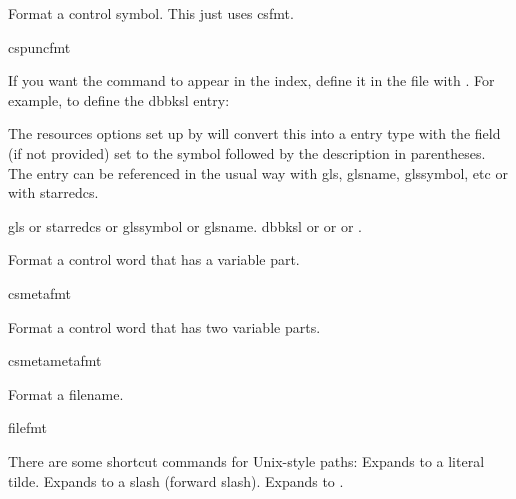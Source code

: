 \documentclass[toc=listof]{scrreport}
\begin{document}
Format a control symbol. This just uses \gls{csfmt}.
\begin{coderesult}
\gls{cspuncfmt}
\tcblower
\cspuncfmt{\textasciitilde}
\end{coderesult}

If you want the command to appear in the index, define it in the
 file with . For example, to define
the \gls{dbbksl} entry:
\begin{codebox}
\end{codebox}
The resources options set up by  will convert this
into a  entry type with the  field
(if not provided) set to the symbol followed by the description in
parentheses. The entry can be referenced in the usual way with
\gls{gls}, \gls{glsname}, \gls{glssymbol}, etc or with \gls{starredcs}.
\begin{coderesult}
\gls{gls} or
\gls{starredcs} or
\gls{glssymbol} or
\gls{glsname}.
\tcblower
\gls{dbbksl} or
 or
 or
.
\end{coderesult}

Format a control word that has a variable part.
\begin{coderesult}
\gls{csmetafmt}
\tcblower
{}
\end{coderesult}

Format a control word that has two variable parts.
\begin{coderesult}
\gls{csmetametafmt}
\tcblower
{}
\end{coderesult}

Format a filename.
\begin{coderesult}
\gls{filefmt}
\tcblower
{}
\end{coderesult}
There are some shortcut commands for Unix-style paths:
Expands to a literal \gls{tilde}.
Expands to a \gls{slash} (forward slash).
Expands to
.
\end{document}
